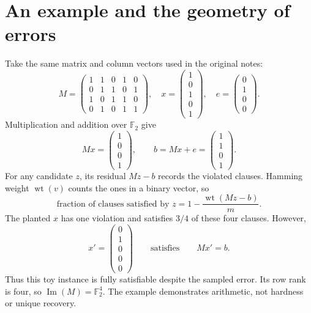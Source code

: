 \documentclass[11pt,a4paper]{article}
\newcommand{\F}{\mathbb F}
\newcommand{\wt}{\operatorname{wt}}
\newcommand{\Image}{\operatorname{Im}}
\begin{document}
\section{An example and the geometry of errors}\label{sec:example}
Take the same matrix and column vectors used in the original notes:
\begin{equation}
 M=\begin{pmatrix}1&1&0&1&0\\0&1&1&0&1\\1&0&1&1&0\\0&1&0&1&1\end{pmatrix},\quad
 x=\begin{pmatrix}1\\0\\1\\0\\1\end{pmatrix},\quad
 e=\begin{pmatrix}0\\1\\0\\0\end{pmatrix}.
\end{equation}
Multiplication and addition over $\F_2$ give
\begin{equation}
 Mx=\begin{pmatrix}1\\0\\0\\1\end{pmatrix},\qquad
 b=Mx+e=\begin{pmatrix}1\\1\\0\\1\end{pmatrix}.
\end{equation}
For any candidate $z$, its residual $Mz-b$ records the violated clauses. Hamming weight $\wt(v)$ counts the ones in a binary vector, so
\begin{equation}
 \text{fraction of clauses satisfied by }z=1-\frac{\wt(Mz-b)}m.
\end{equation}
The planted $x$ has one violation and satisfies $3/4$ of these four clauses. However,
\[
 x'=\begin{pmatrix}0\\1\\0\\0\\0\end{pmatrix}\qquad\text{satisfies}\qquad Mx'=b.
\]
Thus this toy instance is fully satisfiable despite the sampled error. Its row rank is four, so $\Image(M)=\F_2^4$. The example demonstrates arithmetic, not hardness or unique recovery.
\end{document}

